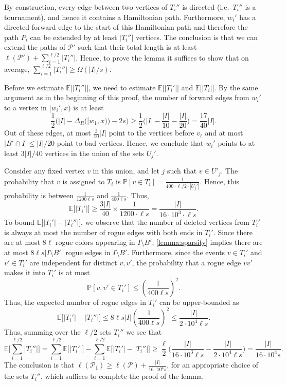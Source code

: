 \documentclass[a4paper,11pt]{article}
\makeatletter
\renewenvironment{proof}[1][\proofname] {\par\pushQED{\qed}\normalfont\topsep6\p@\@plus6\p@\relax\trivlist\item[\hskip\labelsep\bfseries#1\@addpunct{.}]\ignorespaces}{\popQED\endtrivlist\@endpefalse}
\theoremstyle{definition}
\def\E{\mathbb{E}}
\def\Pb{\mathbb{P}}
\def\cP{\mathcal{P}}
\makeatother
\begin{document}
\begin{proof}
By construction, every edge between two vertices of $T_i''$ is directed (i.e.\ $T_i''$ is a tournament), and hence it contains a Hamiltonian path. Furthermore, $w_i'$ has a directed forward edge to the start of this Hamiltonian path and therefore the path $P_i$ can be extended by at least $|T_i''|$ vertices. The conclusion is that we can extend the paths of $\cP'$ such that their total length is at least $\ell(\cP')+\sum_{i=1}^{\ell/2}|T_i''|$. Hence, to prove the lemma it suffices to show that on average, $\sum_{i=1}^{\ell/2}|T_i''|\geq \Omega(|I|/s)$.

Before we estimate $\E\big[|T_i''|\big]$, we need to estimate $\E\big[|T_i'|\big]$ and $\E\big[|T_i|\big]$. By the same argument as in the beginning of this proof, the number of forward edges from $w_i'$ to a vertex in $[w_i', x)$ is at least \[\frac{1}{2}\Big(|I|-\Delta_R\big([w_1, x)\big) - 2s\Big)\geq \frac{1}{2} \Big(|I|-\frac{|I|}{10}-\frac{|I|}{20}\Big)=\frac{17}{40}|I|.\]
Out of these edges, at most $\frac{3}{10}|I|$ point to the vertices before $v_\ell$ and at most $|B'\cap I|\leq |I|/20$ point to bad vertices. Hence, we conclude that $w_i'$ points to at least $3|I|/40$ vertices in the union of the sets $U_j'$.

Consider any fixed vertex $v$ in this union, and let $j$ such that $v \in U'_j$. The probability that $v$ is assigned to $T_i$ is $\Pb[v\in T_i]=\frac{1}{400 \cdot \ell/2\cdot |U_j'|}$. Hence, this probability is between $\frac{1}{1200  \ell s}$ and 
$\frac{1}{400  \ell s}$. Thus,  
\[\E\big[|T_i'|\big]\geq \frac{3|I|}{40} \times \frac{1}{1200\cdot \ell s}=\frac{|I|}{16\cdot 10^3 \cdot \ell s}.\]
To bound $\E\big[|T_i'|-|T_i''|\big]$, we observe that the number of deleted vertices from $T_i'$ is always at most the number of rogue edges with both ends in $T_i'$. 
Since there are at most $8\ell$ rogue colors appearing in $I\setminus B'$, \cref{lemma:sparsity} implies there are at most $8\ell s |I\setminus B'|$ rogue edges in $I\setminus B'$. 
Furthermore, since the events $v \in T_i'$ and $v' \in T_i'$ are independent for distinct $v,v'$, the probability that a rogue edge $vv'$ makes it into $T_i'$ is at most \[\Pb[v, v'\in T_i']\leq \left(\frac{1}{400 \ell s }\right)^2.\]
Thus, the expected number of rogue edges in $T_i'$ can be upper-bounded as 
\[\E\Big[|T_i'|-|T_i''|\Big]\leq 8\ell s |I|\left(\frac{1}{400 \ell s }\right)^2\leq \frac{|I|}{2\cdot 10^4 \ell s}.\]
Thus, summing over the $\ell/2$ sets $T_i''$ we see that 
\[\E\bigg[\sum_{i=1}^{\ell/2}|T_i''|\bigg]= \sum_{i=1}^{\ell/2}\E\big[|T_i'|\big] - \sum_{i=1}^{\ell/2}\E\big[|T_i'|-|T_i''|\big] \geq \frac{\ell}{2}\Big(\frac{|I|}{16\cdot 10^3 \ell s}-\frac{|I|}{2\cdot 10^4 \ell s}\Big)=\frac{|I|}{16\cdot 10^4 s}.\]
The conclusion is that $\ell(\cP_1)\geq \ell(\cP)+\frac{|I|}{16\cdot 10^4 s}$, for an appropriate choice of the sets $T_i''$, which suffices to complete the proof of the lemma.
\end{proof}
\end{document}
